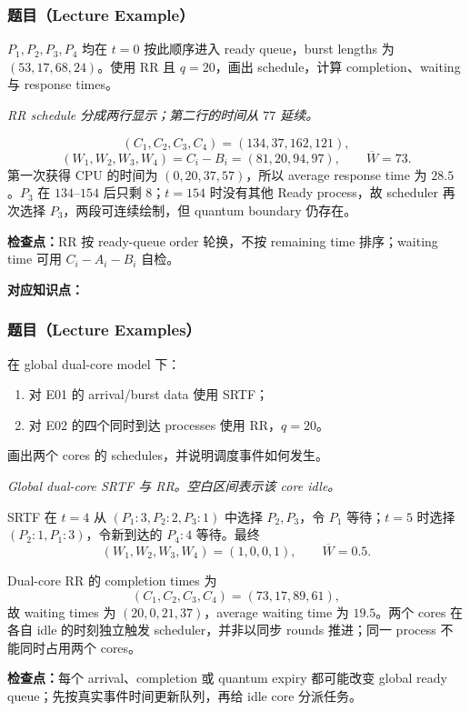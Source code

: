 \subsubsection*{题目（Lecture Example）}

$P_1,P_2,P_3,P_4$ 均在 $t=0$ 按此顺序进入 ready queue，burst lengths 为 $(53,17,68,24)$。使用 RR 且 $q=20$，画出 schedule，计算 completion、waiting 与 response times。

\begin{checkedsolution}
\begin{center}
  \resizebox{0.96\textwidth}{!}{}

  \smallskip
  \textit{RR schedule 分成两行显示；第二行的时间从 $77$ 延续。}
\end{center}

\[
  (C_1,C_2,C_3,C_4)=(134,37,162,121),
\]
\[
  (W_1,W_2,W_3,W_4)=C_i-B_i=(81,20,94,97),\qquad \overline W=73.
\]
第一次获得 CPU 的时间为 $(0,20,37,57)$，所以 average response time 为 $28.5$。$P_3$ 在 $134$--$154$ 后只剩 $8$；$t=154$ 时没有其他 Ready process，故 scheduler 再次选择 $P_3$，两段可连续绘制，但 quantum boundary 仍存在。
\end{checkedsolution}

\textbf{检查点：}RR 按 ready-queue order 轮换，不按 remaining time 排序；waiting time 可用 $C_i-A_i-B_i$ 自检。


\textbf{对应知识点：}

\subsubsection*{题目（Lecture Examples）}

在 global dual-core model 下：
\begin{enumerate}
  \item 对 E01 的 arrival/burst data 使用 SRTF；
  \item 对 E02 的四个同时到达 processes 使用 RR，$q=20$。
\end{enumerate}
画出两个 cores 的 schedules，并说明调度事件如何发生。

\begin{checkedsolution}
\begin{center}
  \resizebox{0.96\textwidth}{!}{}

  \smallskip
  \textit{Global dual-core SRTF 与 RR。空白区间表示该 core idle。}
\end{center}

SRTF 在 $t=4$ 从 $(P_1:3,P_2:2,P_3:1)$ 中选择 $P_2,P_3$，令 $P_1$ 等待；$t=5$ 时选择 $(P_2:1,P_1:3)$，令新到达的 $P_4:4$ 等待。最终
\[
  (W_1,W_2,W_3,W_4)=(1,0,0,1),\qquad \overline W=0.5.
\]

Dual-core RR 的 completion times 为
\[
  (C_1,C_2,C_3,C_4)=(73,17,89,61),
\]
故 waiting times 为 $(20,0,21,37)$，average waiting time 为 $19.5$。两个 cores 在各自 idle 的时刻独立触发 scheduler，并非以同步 rounds 推进；同一 process 不能同时占用两个 cores。
\end{checkedsolution}

\textbf{检查点：}每个 arrival、completion 或 quantum expiry 都可能改变 global ready queue；先按真实事件时间更新队列，再给 idle core 分派任务。
